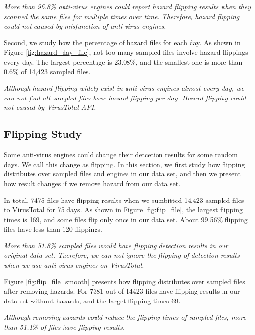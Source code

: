 {\it{More than 96.8\% anti-virus engines could report hazard flipping results when they scanned the same files for multiple times over time. Therefore, hazard flipping could not caused by misfunction of anti-virus engines. 
}}

Second, we study how the percentage of hazard files for each day. As shown in Figure \ref{fig:hazard_day_file}, not too many sampled files involve hazard flippings every day. The largest percentage is 23.08\%, and the smallest one is more than 0.6\% of 14,423 sampled files. 

{\it{Although hazard flipping widely exist in anti-virus engines almost every day, we can not find all sampled files have hazard flipping per day. Hazard flipping could not caused by VirusTotal API.
}}



\subsection{Flipping Study}

Some anti-virus engines could change their detcetion results for some random days. We call this change as flipping. In this section, we first study how flipping distributes over sampled files and engines in our data set, and then we present how result changes if we remove hazard from our data set.

In total, 7475 files have flipping results when we sumbitted 14,423 sampled files to VirusTotal for 75 days. As shown in Figure \ref{fig:flip_file}, the largest flipping times is 169, and some files flip only once in our data set. About 99.56\% flipping files have less than 120 flippings. 

{\it{More than 51.8\% sampled files would have flipping detection results in our original data set. Therefore, we can not ignore the flipping of detection results when we use anti-virus engines on VirusTotal.
}}

Figure \ref{fig:flip_file_smooth} presents how flipping distributes over sampled files after removing hazards. For 7381 out of 14423 files have flipping results in our data set without hazards, and the larget flipping times 69. 

{\it{Although removing hazards could reduce the flipping times of sampled files, more than 51.1\% of files have flipping results. 
}}


